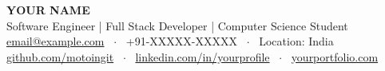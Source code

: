 
\begin{center}
    {\Huge \bfseries \color{primaryColor} YOUR NAME} \\[4pt]
    {\small \color{subtextColor} Software Engineer | Full Stack Developer | Computer Science Student} \\[4pt]
    \small 
    \href{mailto:email@example.com}{email@example.com} \ $\cdot$ \ 
    +91-XXXXX-XXXXX \ $\cdot$ \ 
    Location: India \\[2pt]
    \href{https://github.com/motoingit}{github.com/motoingit} \ $\cdot$ \ 
    \href{https://linkedin.com/in/yourprofile}{linkedin.com/in/yourprofile} \ $\cdot$ \ 
    \href{https://yourportfolio.com}{yourportfolio.com}
\end{center}
\vspace{-6pt}
